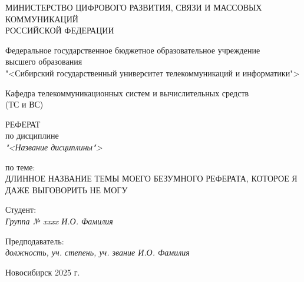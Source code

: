\thispagestyle{empty}

\begin{center}
    МИНИСТЕРСТВО ЦИФРОВОГО РАЗВИТИЯ, СВЯЗИ И МАССОВЫХ КОММУНИКАЦИЙ \\ РОССИЙСКОЙ ФЕДЕРАЦИИ

    \vspace{20pt}

    Федеральное государственное бюджетное образовательное учреждение  \\  высшего образования \\
    "<Сибирский государственный университет телекоммуникаций и информатики"> \\

    \vspace{20pt}

    Кафедра телекоммуникационных систем и вычислительных средств \\  (ТС и ВС)
\end{center}

\vfill

\begin{center}
    РЕФЕРАТ \\  
    по дисциплине \\
    \textit{"<Название дисциплины">}

    \vspace{20pt}

    по теме: \\
    \uppercase{Длинное название темы моего безумного реферата, которое я даже выговорить не могу}
\end{center}

\vfill

    \noindent Студент: \\
    \textit{Группа № xxxx \hfill И.О. Фамилия}

    \vspace{20pt}

    \noindent Предподаватель: \\
    \textit{должность, уч. степень, уч. звание \hfill И.О. Фамилия}

\vfill

\begin{center}
    Новосибирск 2025 г.
\end{center}